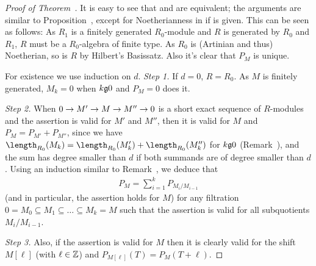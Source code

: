 \documentclass[a4paper,parskip=half,numbers=enddot, DIV=12, headheight=30pt]{scrreprt}
\begin{document}
\begin{proof}[Proof of Theorem~]
    It is easy to see that  and  are equivalent; the arguments are similar to Proposition~, except for Noetherianness in  if  is given. This can be seen as follows: As $R_1$ is a finitely generated $R_0$-module and $R$ is generated by $R_0$ and $R_1$, $R$ must be a $R_0$-algebra of finite type. As $R_0$ is (Artinian and thus) Noetherian, so is $R$ by Hilbert's Basissatz. Also it's clear that $P_M$ is unique.
    
    For existence we use induction on $d$. \emph{Step 1.} If $d=0$, $R=R_0$. As $M$ is finitely generated, $M_k = 0$ when $k\gge0$ and $P_M =0$ does it. 
    
    \emph{Step 2.} When $0\morphism M'\morphism M\morphism M'' \morphism 0$ is a short exact sequence of $R$-modules and the assertion is valid for $M'$ and $M''$, then it is valid for $M$ and $P_M = P_{M'} +P_{M''}$, since we have $\length_{R_0}(M_k) = \length_{R_0}(M'_k)+\length_{R_0}(M''_k) $ for $k\gge 0$ (Remark~), and the sum has degree smaller than $d$ if both summands are of degree smaller than $d$. Using an induction similar to Remark~, we deduce that 
    \begin{align*}
    	P_M=\sum_{i=1}^kP_{M_i/M_{i-1}}
    \end{align*}
    (and in particular, the assertion holds for $M$) for any filtration $0=M_0\subseteq M_1\subseteq\ldots\subseteq M_k=M$ such that the assertion is valid for all subquotients $M_i/M_{i-1}$. 
    
    \emph{Step 3.} Also, if the assertion is valid for $M$ then it is clearly valid for the shift $M[\ell]$ (with $\ell\in\mathbb{Z}$) and $P_{M[\ell]}(T) = P_M(T+\ell)$. 
    

\end{proof}
\end{document}
